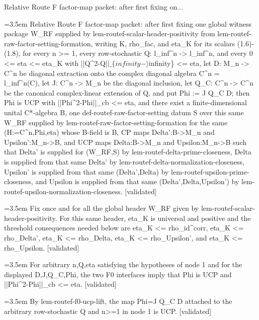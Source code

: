 \documentclass{article}
\newcommand{\step}[1]{\par\noindent\hangindent=3.5em\hangafter=1%
  \makebox[3.5em][l]{\textbf{#1.}}}
\newcommand{\steptag}[1]{\hfill{\small\textsf{[#1]}}}
\begin{document}
\begin{proofbox}{Relative Route F factor-map packet: after first fixing on...}
\step{1} Relative Route F factor-map packet: after first fixing one global witness package W\_RF supplied by lem-routef-scalar-header-positivity from lem-routef-raw-factor-setting-formation, writing K, rho\_fac, and eta\_K for its scalars (1.6)-(1.8), for every n >= 1, every row-stochastic Q: l\_inf\textasciicircum{}n -> l\_inf\textasciicircum{}n, and every 0 <= eta <= eta\_K with ||Q\textasciicircum{}2-Q|$|\_\{infinity-\rangle$infinity\} <= eta, let D: M\_n -> C\textasciicircum{}n be diagonal extraction onto the complex diagonal algebra C\textasciicircum{}n = l\_inf\textasciicircum{}n(C), let J: C\textasciicircum{}n -> M\_n be the diagonal inclusion, let Q\_C: C\textasciicircum{}n -> C\textasciicircum{}n be the canonical complex-linear extension of Q, and put Phi := J Q\_C D; then Phi is UCP with ||Phi\textasciicircum{}2-Phi||\_cb <= eta, and there exist a finite-dimensional unital C*-algebra B, one def-routef-raw-factor-setting datum S over this same W\_RF supplied by lem-routef-raw-factor-setting-formation for the same (H:=C\textasciicircum{}n,Phi,eta) whose B-field is B, CP maps Delta':B->M\_n and Upsilon':M\_n->B, and UCP maps Delta:B->M\_n and Upsilon:M\_n->B such that Delta' is supplied for (W\_RF,S) by lem-routef-delta-prime-closeness, Delta is supplied from that same Delta' by lem-routef-delta-normalization-closeness, Upsilon' is supplied from that same (Delta',Delta) by lem-routef-upsilon-prime-closeness, and Upsilon is supplied from that same (Delta',Delta,Upsilon') by lem-routef-upsilon-normalization-closeness. \steptag{validated} \\[6pt]
\step{1.1} Fix once and for all the global header W\_RF given by lem-routef-scalar-header-positivity.  For this same header, eta\_K is universal and positive and the threshold consequences needed below are eta\_K <= rho\_id\textasciicircum{}corr, eta\_K <= rho\_Delta', eta\_K <= rho\_Delta, eta\_K <= rho\_Upsilon', and eta\_K <= rho\_Upsilon. \steptag{validated} \\[4pt]
\step{1.2} For arbitrary n,Q,eta satisfying the hypotheses of node 1 and for the displayed D,J,Q\_C,Phi, the two F0 interfaces imply that Phi is UCP and ||Phi\textasciicircum{}2-Phi||\_cb <= eta. \steptag{validated} \\[6pt]
\step{1.2.1} By lem-routef-f0-ucp-lift, the map Phi=J Q\_C D attached to the arbitrary row-stochastic Q and n>=1 in node 1 is UCP. \steptag{validated} \\[4pt]

\end{proofbox}
\end{document}
